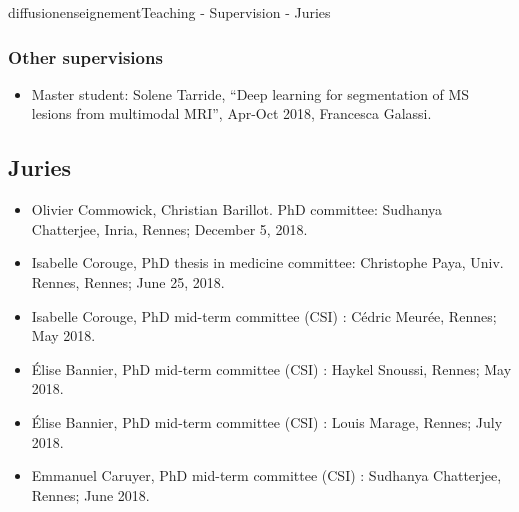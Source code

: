 \documentclass{ra2018}
\begin{document}
\begin{module}{diffusion}{enseignement}{Teaching - Supervision - Juries}
  \subsubsection{Other supervisions}
  \begin{itemize}
           \item Master student: Solene Tarride, ``Deep learning for segmentation of MS lesions from multimodal MRI'', Apr-Oct 2018, Francesca Galassi.
  \end{itemize}

\subsection {Juries}
\begin{itemize}
    \item Olivier Commowick, Christian Barillot. PhD committee: Sudhanya Chatterjee, Inria, Rennes; December 5, 2018.
    \item Isabelle Corouge, PhD thesis in medicine committee: Christophe Paya, Univ. Rennes, Rennes; June 25, 2018.
    \item Isabelle Corouge, PhD mid-term committee (CSI) : Cédric Meurée, Rennes; May 2018.
    \item Élise Bannier, PhD mid-term committee (CSI) : Haykel Snoussi, Rennes; May 2018.
    \item Élise Bannier, PhD mid-term committee (CSI) : Louis Marage, Rennes; July 2018.
    \item Emmanuel Caruyer, PhD mid-term committee (CSI) : Sudhanya Chatterjee, Rennes; June 2018.
\end{itemize}


\end{module}
\end{document}
